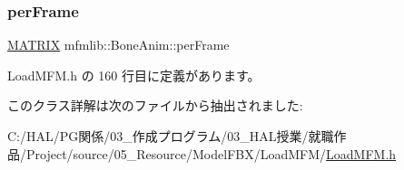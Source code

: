 \subsubsection{\texorpdfstring{per\+Frame}{perFrame}}
{\footnotesize\ttfamily \mbox{\hyperlink{classmfmlib_1_1_m_a_t_r_i_x}{M\+A\+T\+R\+IX}} mfmlib\+::\+Bone\+Anim\+::per\+Frame}



 Load\+M\+F\+M.\+h の 160 行目に定義があります。



このクラス詳解は次のファイルから抽出されました\+:\begin{DoxyCompactItemize}
\item 
C\+:/\+H\+A\+L/\+P\+G関係/03\+\_\+作成プログラム/03\+\_\+\+H\+A\+L授業/就職作品/\+Project/source/05\+\_\+\+Resource/\+Model\+F\+B\+X/\+Load\+M\+F\+M/\mbox{\hyperlink{_load_m_f_m_8h}{Load\+M\+F\+M.\+h}}\end{DoxyCompactItemize}
